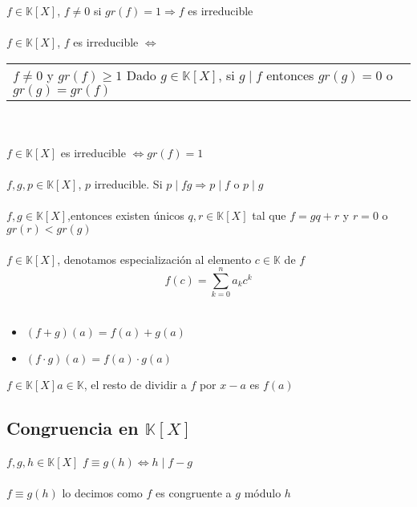 \documentclass[a4paper,10pt]{article}
\begin{document}
 $f \in \mathbb{K}[X]$, $f \neq 0$ si $gr(f) = 1 \Rightarrow f$ es irreducible \\ \\

 $f \in \mathbb{K}[X]$, $f$ es irreducible $\Leftrightarrow$
\begin{tabular}{l}
	$f \neq 0$ y $gr(f) \geq 1$
	\cr Dado $g \in \mathbb{K}[X]$, si $g \mid f$ entonces $gr(g) = 0$ o $gr(g) = gr(f)$
\end{tabular} \\ \\

\propiedad $f \in \mathbb{K}[X]$ es irreducible $\Leftrightarrow gr(f)=1$ \\ \\

\propiedad $f,g,p \in \mathbb{K}[X]$, $p$ irreducible. Si $p \mid fg \Rightarrow p \mid f$ o $p \mid g$ \\ \\

 $f,g \in \mathbb{K}[X]$,entonces existen únicos $q,r \in \mathbb{K}[X]$ tal que $f=gq+r$ y $r = 0$ o $gr(r) < gr(g)$ \\ \\

 $f \in \mathbb{K}[X]$, denotamos especialización al elemento $c \in \mathbb{K}$ de $f$
$$ f(c) = \sum_{k=0}^{n} {a_k c^{k}} $$ \\ 

\propiedades
\begin{itemize}
	\item $(f+g)(a) = f(a)+g(a)$
	\item $(f \cdot g)(a) = f(a) \cdot g(a)$
\end{itemize}

\teorema $f \in \mathbb{K}[X] a \in \mathbb{K}$, el resto de dividir a $f$ por $x-a$ es $f(a)$


\subsection{Congruencia en $\mathbb{K}[X]$}


 $f,g,h \in \mathbb{K}[X]$ $f \equiv g (h) \Leftrightarrow h \mid f - g$ \\ \\

\notacion $f \equiv g (h)$ lo decimos como $f$ es congruente a $g$ módulo $h$ \\ \\
\end{document}
